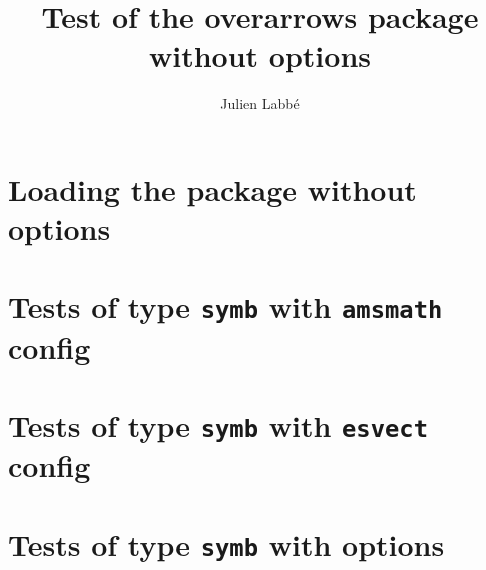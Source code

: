 \documentclass{article}
\title{Test of the \textsf{overarrows} package\\ without options}
\author{Julien Labb\'e}
\begin{document}
\maketitle

\section{Loading the package without options}

\begin{dispListing}
\usepackage{overarrows}
\end{dispListing}

\section{Tests of type \texttt{symb} with \texttt{amsmath} config}

\begin{dispExample}
\TestOverArrow*{\amsvector}
\end{dispExample}

\begin{dispExample}
\TestOverArrow*{\amsstrictvector}
\end{dispExample}

\section{Tests of type \texttt{symb} with \texttt{esvect} config}

\begin{dispExample}
\TestOverArrow*{\esvector}
\end{dispExample}

\begin{dispExample}
\TestOverArrow*{\esstrictvector}
\end{dispExample}

\section{Tests of type \texttt{symb} with options}

\begin{dispExample}
\TestOverArrow*{\testovertextarrow}
\end{dispExample}
\end{document}
